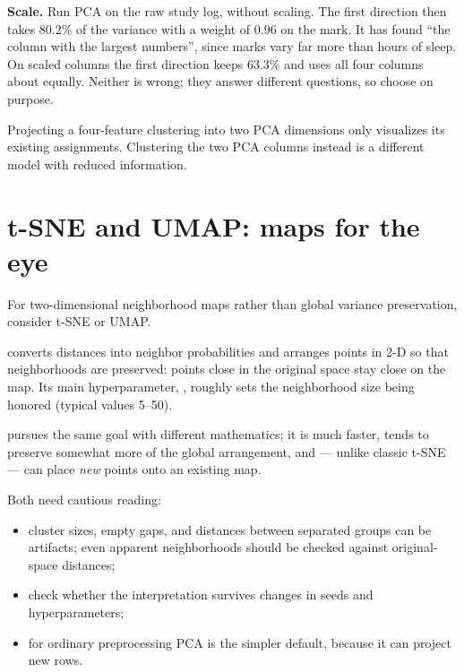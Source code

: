 \begin{workedexample}
\textbf{Scale.} Run PCA on the raw study log, without scaling. The first direction then takes 80.2\% of the variance with a weight of 0.96 on the mark. It has found ``the column with the largest numbers'', since marks vary far more than hours of sleep. On scaled columns the first direction keeps 63.3\% and uses all four columns about equally. Neither is wrong; they answer different questions, so choose on purpose.
\end{workedexample}

\begin{pitfall}
Projecting a four-feature clustering into two PCA dimensions only visualizes its existing assignments. Clustering the two PCA columns instead is a different model with reduced information.
\end{pitfall}

\section{t-SNE and UMAP: maps for the eye}
\label{sec:tsne-umap}

For two-dimensional neighborhood maps rather than global variance preservation, consider t-SNE or UMAP.

 converts distances into neighbor probabilities and arranges points in 2-D so that neighborhoods are preserved: points close in the original space stay close on the map. Its main hyperparameter, , roughly sets the neighborhood size being honored (typical values 5--50).

 pursues the same goal with different mathematics; it is much faster, tends to preserve somewhat more of the global arrangement, and --- unlike classic t-SNE --- can place \emph{new} points onto an existing map.

Both need cautious reading:

\begin{itemize}
  \item cluster sizes, empty gaps, and distances between separated groups can be artifacts; even apparent neighborhoods should be checked against original-space distances;
  \item check whether the interpretation survives changes in seeds and hyperparameters;
  \item for ordinary preprocessing PCA is the simpler default, because it can project new rows.
\end{itemize}

